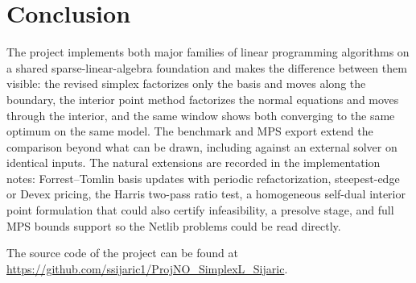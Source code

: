 \documentclass[12pt, a4paper]{article}
\begin{document}
\section{Conclusion}
The project implements both major families of linear programming algorithms on a shared sparse-linear-algebra foundation and makes the difference between them visible: the revised simplex factorizes only the basis and moves along the boundary, the interior point method factorizes the normal equations and moves through the interior, and the same window shows both converging to the same optimum on the same model. The benchmark and MPS export extend the comparison beyond what can be drawn, including against an external solver on identical inputs. The natural extensions are recorded in the implementation notes: Forrest--Tomlin basis updates with periodic refactorization, steepest-edge or Devex pricing, the Harris two-pass ratio test, a homogeneous self-dual interior point formulation that could also certify infeasibility, a presolve stage, and full MPS bounds support so the Netlib problems could be read directly.

The source code of the project can be found at \url{https://github.com/ssijaric1/ProjNO_SimplexL_Sijaric}.
\end{document}
